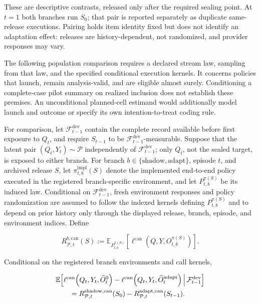 \documentclass[10pt]{article} %
\providecommand{\1}{\mathbf{1}}  %
\theoremstyle{remark}
\theoremstyle{definition}
\begin{document}
These are descriptive contrasts, released only after the required
sealing point. At $t=1$ both branches run $S_0$; that pair is reported
separately as duplicate same-release executions. Pairing holds item
identity fixed but does not identify an adaptation effect: releases are
history-dependent, not randomized, and provider responses may vary.

The following population comparison requires a declared stream law,
sampling from that law, and the specified conditional execution kernels.
It concerns policies that launch, remain analysis-valid, and are eligible
almost surely. Conditioning a complete-case pilot summary on realized
inclusion does not establish these premises. An unconditional
planned-cell estimand would additionally model launch and outcome or
specify its own intention-to-treat coding rule.

For comparison, let $\mathcal F_{t-1}^{\mathrm{dev}}$ contain the complete record available before first exposure to $Q_t$, and require $S_{t-1}$ to be $\mathcal F_{t-1}^{\mathrm{dev}}$-measurable. Suppose that the latent pair $(Q_t,Y_t)\sim\mathcal P$ independently of $\mathcal F_{t-1}^{\mathrm{dev}}$; only $Q_t$, not the sealed target, is exposed to either branch. For branch $b\in\{\mathrm{shadow},\mathrm{adapt}\}$, episode $t$, and archived release $S$, let $\pi_{t,b}^{\mathrm{impl}}(S)$ denote the implemented end-to-end policy executed in the registered branch-specific environment, and let $P_{t,b}^{\pi(S)}$ be its induced law. Conditional on $\mathcal F_{t-1}^{\mathrm{dev}}$, fresh environment responses and policy randomization are assumed to follow the indexed kernels defining $P_{t,b}^{\pi(S)}$ and to depend on prior history only through the displayed release, branch, episode, and environment indices. Define

\begin{equation}
R_{\mathcal P,t}^{b,\mathrm{can}}(S)
:=
\mathbb E_{P_{t,b}^{\pi(S)}}\!\left[
\ell^{\mathrm{can}}\!\left(
Q,Y,O_{t,b}^{\pi(S)}
\right)
\right].
\end{equation}

Conditional on the registered branch environments and call kernels,

\begin{align}
&\mathbb E\!\left[
\ell^{\mathrm{can}}\!\left(Q_t,Y_t,\widehat O_t^0\right)
-
\ell^{\mathrm{can}}\!\left(Q_t,Y_t,\widehat O_t^{\mathrm{adapt}}\right)
\,\middle|\,
\mathcal F_{t-1}^{\mathrm{dev}}
\right]
\notag\\
&\qquad=
R_{\mathcal P,t}^{\mathrm{shadow},\mathrm{can}}(S_0)
-
R_{\mathcal P,t}^{\mathrm{adapt},\mathrm{can}}(S_{t-1}).
\label{eq:conditional-first-contact-target}
\end{align}
\end{document}
